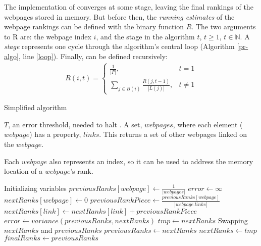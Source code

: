 The implementation of \pr{} converges at some stage, leaving the final rankings of the
webpages stored in memory.  But before then,
the {\it running estimates} of the webpage rankings can be defined with the
binary function $R$.  The two arguments to R are: the webpage index $i$,
and the stage in the algorithm $t$, $t \ge 1$, $t \in \mathbb{N}$.  A {\it stage} represents one
cycle through the algorithm's central loop (Algorithm \ref{pr-algo}, line
\ref{loop}). Finally, \pr{} can be defined recursively:
\begin{align}
    R(i, t) = 
    \begin{cases}
        \frac{1}{|P|}, & t = 1\\
        \sum_{j \in B(i)} \frac{R(j, t - 1)}{|L(j)|}, & t \ne 1
    \end{cases}
\end{align}
\begin{algorithm}
\end{algorithm}
\begin{algorithm}
    \caption{Simplified \pr{} algorithm}\label{pr-algo}
    \begin{algorithmic}[1]
    \Require $T$, an error threshold, needed to halt \pr{}.
    \Require A set, $webpages$, where each element ($webpage$) has a
        property, $links$.  This returns a set of other webpages linked on
        the $webpage$.
        
        Each $webpage$ also represents an index, so it can
        be used to address the memory location of a $webpage$'s rank.

    \Comment Initializing variables
        \State $previousRanks[webpage] \gets \frac{1}{|webpages|}$
    \EndFor
    \State $error \gets \infty$\;
    \label{loop}
            \State $nextRanks[webpage] \gets 0$
        \EndFor
                \State $previousRankPiece \gets \frac{previousRanks[webpage]}{|webpage.links|}$
                    \State $nextRanks[link] \gets nextRanks[link] + previousRankPiece$
                \EndFor
            \EndIf
        \EndFor
        \State $error \gets variance(previousRanks, nextRanks)$
        \State $tmp \gets nextRanks$
        \Comment Swapping $nextRanks$ and $previousRanks$
        \State $previousRanks \gets nextRanks$
        \State $nextRanks \gets tmp$
    \EndWhile
    \State $finalRanks \gets previousRanks$
    \end{algorithmic}
\end{algorithm}
